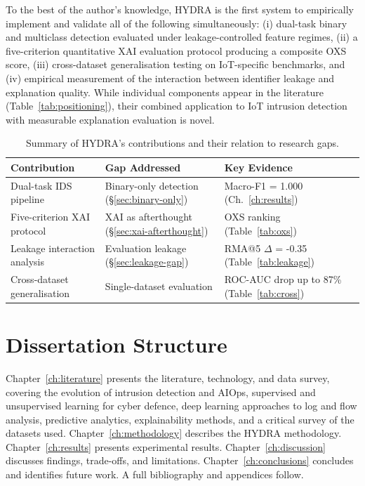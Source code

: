 \documentclass[12pt,a4paper]{report}
\begin{document}
To the best of the author's knowledge, HYDRA is the first system to empirically implement and validate all of the following simultaneously: (i) dual-task binary and multiclass detection evaluated under leakage-controlled feature regimes, (ii) a five-criterion quantitative XAI evaluation protocol producing a composite OXS score, (iii) cross-dataset generalisation testing on IoT-specific benchmarks, and (iv) empirical measurement of the interaction between identifier leakage and explanation quality. While individual components appear in the literature (Table~\ref{tab:positioning}), their combined application to IoT intrusion detection with measurable explanation evaluation is novel.

\begin{table}[H]
\caption{Summary of HYDRA's contributions and their relation to research gaps.}
\label{tab:contributions}
\centering
\begin{tabular}{p{}p{}p{}}
\toprule
\textbf{Contribution} & \textbf{Gap Addressed} & \textbf{Key Evidence} \\
\midrule
Dual-task IDS pipeline & Binary-only detection (\S\ref{sec:binary-only}) & Macro-F1 = 1.000 (Ch.~\ref{ch:results}) \\
Five-criterion XAI protocol & XAI as afterthought (\S\ref{sec:xai-afterthought}) & OXS ranking (Table~\ref{tab:oxs}) \\
Leakage interaction analysis & Evaluation leakage (\S\ref{sec:leakage-gap}) & RMA@5 $\Delta$ = -0.35 (Table~\ref{tab:leakage}) \\
Cross-dataset generalisation & Single-dataset evaluation & ROC-AUC drop up to 87\% (Table~\ref{tab:cross}) \\
\bottomrule
\end{tabular}
\end{table}

\section{Dissertation Structure}
\label{sec:structure}

Chapter~\ref{ch:literature} presents the literature, technology, and data survey, covering the evolution of intrusion detection and AIOps, supervised and unsupervised learning for cyber defence, deep learning approaches to log and flow analysis, predictive analytics, explainability methods, and a critical survey of the datasets used. Chapter~\ref{ch:methodology} describes the HYDRA methodology. Chapter~\ref{ch:results} presents experimental results. Chapter~\ref{ch:discussion} discusses findings, trade-offs, and limitations. Chapter~\ref{ch:conclusions} concludes and identifies future work. A full bibliography and appendices follow.
\end{document}
